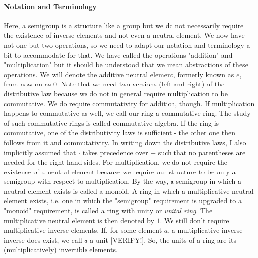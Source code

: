 \paragraph{Notation and Terminology}
Here, a semigroup is a structure like a group but we do not necessarily require the existence of inverse elements and not even a neutral element. We now have not one but two operations, so we need to adapt our notation and terminology a bit to accommodate for that. We have called the operations "addition" and "multiplication" but it should be understood that we mean abstractions of these operations. We will denote the additive neutral element, formerly known as $e$, from now on as $0$. Note that we need two versions (left and right) of the distributive law because we do not in general require multiplication to be commutative. We do require commutativity for addition, though. If multiplication happens to commutative as well, we call our ring a commutative ring. The study of such commutative rings is called commutative algebra. If the ring is commutative, one of the distributivity laws is sufficient - the other one then follows from it and commutativity. In writing down the distributive laws, I also implicitly assumed that $\cdot$ takes precedence over $+$ such that no parentheses are needed for the right hand sides. For multiplication, we do not require the existence of a neutral element because we require our structure to be only a semigroup with respect to multiplication. By the way, a semigroup in which a neutral element exists is called a monoid. A ring in which a multiplicative neutral element exists, i.e. one in which the "semigroup" requirement is upgraded to a "monoid" requirement, is called a ring with unity or \emph{unital ring}. The multiplicative neutral element is then denoted by $1$. We still don't require multiplicative inverse elements. If, for some element $a$, a multiplicative inverse inverse does exist, we call $a$ a unit [VERIFY!]. So, the units of a ring are its (multiplicatively) invertible elements.






